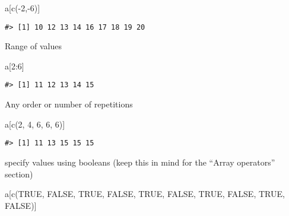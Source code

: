 \documentclass[
]{book}
\newenvironment{Shaded}{\begin{snugshade}}{\end{snugshade}}
\newcommand{\ConstantTok}[1]{\textcolor[rgb]{0.00,0.00,0.00}{#1}}
\newcommand{\DecValTok}[1]{\textcolor[rgb]{0.00,0.00,0.81}{#1}}
\newcommand{\FunctionTok}[1]{\textcolor[rgb]{0.00,0.00,0.00}{#1}}
\newcommand{\NormalTok}[1]{#1}
\newcommand{\SpecialCharTok}[1]{\textcolor[rgb]{0.00,0.00,0.00}{#1}}
\begin{document}
\begin{Shaded}
\begin{Highlighting}[]
\NormalTok{a[}\FunctionTok{c}\NormalTok{(}\SpecialCharTok{{-}}\DecValTok{2}\NormalTok{,}\SpecialCharTok{{-}}\DecValTok{6}\NormalTok{)]}
\end{Highlighting}
\end{Shaded}

\begin{verbatim}
#> [1] 10 12 13 14 16 17 18 19 20
\end{verbatim}

Range of values

\begin{Shaded}
\begin{Highlighting}[]
\NormalTok{a[}\DecValTok{2}\SpecialCharTok{:}\DecValTok{6}\NormalTok{]}
\end{Highlighting}
\end{Shaded}

\begin{verbatim}
#> [1] 11 12 13 14 15
\end{verbatim}

Any order or number of repetitions

\begin{Shaded}
\begin{Highlighting}[]
\NormalTok{a[}\FunctionTok{c}\NormalTok{(}\DecValTok{2}\NormalTok{, }\DecValTok{4}\NormalTok{, }\DecValTok{6}\NormalTok{, }\DecValTok{6}\NormalTok{, }\DecValTok{6}\NormalTok{)]}
\end{Highlighting}
\end{Shaded}

\begin{verbatim}
#> [1] 11 13 15 15 15
\end{verbatim}

specify values using booleans (keep this in mind for the ``Array operators'' section)

\begin{Shaded}
\begin{Highlighting}[]
\NormalTok{a[}\FunctionTok{c}\NormalTok{(}\ConstantTok{TRUE}\NormalTok{, }\ConstantTok{FALSE}\NormalTok{, }\ConstantTok{TRUE}\NormalTok{, }\ConstantTok{FALSE}\NormalTok{, }\ConstantTok{TRUE}\NormalTok{, }\ConstantTok{FALSE}\NormalTok{, }\ConstantTok{TRUE}\NormalTok{, }\ConstantTok{FALSE}\NormalTok{, }\ConstantTok{TRUE}\NormalTok{, }\ConstantTok{FALSE}\NormalTok{)]}
\end{Highlighting}
\end{Shaded}
\end{document}
